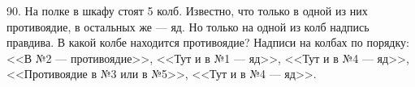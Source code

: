 90. На полке в шкафу стоят 5 колб. Известно, что только в одной из них противоядие, в остальных же --- яд. Но только на одной из колб надпись правдива. В какой колбе находится противоядие? Надписи на колбах по порядку: <<В №2 --- противоядие>>, <<Тут и в №1 --- яд>>, <<Тут и в №4 --- яд>>, <<Противоядие в №3 или в №5>>,
<<Тут и в №4 --- яд>>.\\
